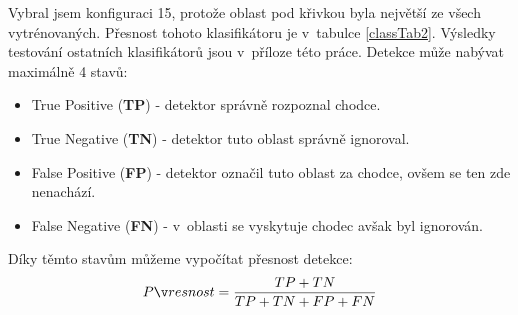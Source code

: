 Vybral jsem konfiguraci 15, protože oblast pod křivkou byla největší ze všech vytrénovaných. Přesnost tohoto klasifikátoru je v~tabulce \ref{classTab2}. Výsledky testování ostatních klasifikátorů jsou v~příloze této práce. Detekce může nabývat maximálně 4 stavů:
\begin{itemize}
	\item{True Positive (\textbf{TP}) - detektor správně rozpoznal chodce.}
	\item{True Negative (\textbf{TN}) - detektor tuto oblast správně ignoroval.}
	\item{False Positive (\textbf{FP}) - detektor označil tuto oblast za chodce, ovšem se ten zde nenachází.}
	\item{False Negative (\textbf{FN}) - v~oblasti se vyskytuje chodec avšak byl ignorován.}
\end{itemize}
Díky těmto stavům můžeme vypočítat přesnost detekce:
\begin{equation*}
\centering
 \label{eq:accuracy}
 \begin{aligned}
 Přesnost = \frac{TP + TN}{TP + TN + FP + FN}
 \end{aligned}
\end{equation*}

